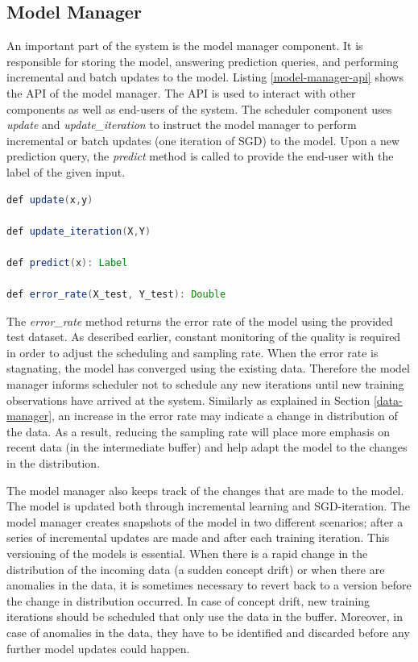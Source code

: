 \documentclass[10pt,conference,letterpaper]{IEEEtran}
\begin{document}
\subsection{Model Manager} \label{model-manager} 
An important part of the system is the model manager component.
It is responsible for storing the model, answering prediction queries, and performing incremental and batch updates to the model.
Listing \ref{model-manager-api} shows the API of the model manager.
The API is used to interact with other components as well as end-users of the system.
The scheduler component uses \textit{update} and \textit{update\_iteration} to instruct the model manager to perform incremental or batch updates (one iteration of SGD) to the model.
Upon a new prediction query, the \textit{predict} method is called to provide the end-user with the label of the given input.

\noindent\begin{minipage}[t]{\linewidth}
\begin{lstlisting}[language=java, basicstyle=\small\ttfamily, frame=tb ,columns=fullflexible,
showstringspaces=false,label=model-manager-api,caption=Model Manager API, numberstyle=\tiny]
def update(x,y)

def update_iteration(X,Y)

def predict(x): Label

def error_rate(X_test, Y_test): Double

\end{lstlisting}
\end{minipage}


The \textit{error\_rate} method returns the error rate of the model using the provided test dataset.
As described earlier, constant monitoring of the quality is required in order to adjust the scheduling and sampling rate.
When the error rate is stagnating, the model has converged using the existing data.
Therefore the model manager informs scheduler not to schedule any new iterations until new training observations have arrived at the system.
Similarly as explained in Section \ref{data-manager}, an increase in the error rate may indicate a change in distribution of the data.
As a result, reducing the sampling rate will place more emphasis on recent data (in the intermediate buffer) and help adapt the model to the changes in the distribution.

The model manager also keeps track of the changes that are made to the model.
The model is updated both through incremental learning and SGD-iteration.
The model manager creates snapshots of the model in two different scenarios; after a series of incremental updates are made and after each training iteration.
This versioning of the models is essential.
When there is a rapid change in the distribution of the incoming data (a sudden concept drift) or when there are anomalies in the data, it is sometimes necessary to revert back to a version before the change in distribution occurred.
In case of concept drift, new training iterations should be scheduled that only use the data in the buffer.
Moreover, in case of anomalies in the data, they have to be identified and discarded before any further model updates could happen.
\end{document}
